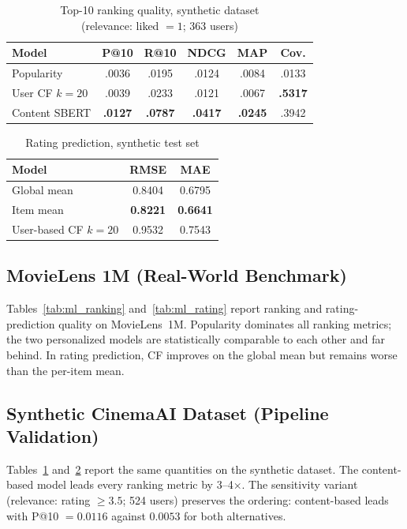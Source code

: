 \documentclass[conference]{IEEEtran}
\begin{document}
\begin{table}[t]
\caption{Top-10 ranking quality, synthetic dataset\\(relevance: liked $=1$; 363 users)}
\label{tab:syn_ranking}
\centering
\begin{tabular}{lccccc}
\toprule
Model & P@10 & R@10 & NDCG & MAP & Cov. \\
\midrule
Popularity & .0036 & .0195 & .0124 & .0084 & .0133 \\
User CF $k{=}20$ & .0039 & .0233 & .0121 & .0067 & \textbf{.5317} \\
Content SBERT & \textbf{.0127} & \textbf{.0787} & \textbf{.0417} & \textbf{.0245} & .3942 \\
\bottomrule
\end{tabular}
\end{table}

\begin{table}[t]
\caption{Rating prediction, synthetic test set}
\label{tab:syn_rating}
\centering
\begin{tabular}{lcc}
\toprule
Model & RMSE & MAE \\
\midrule
Global mean & 0.8404 & 0.6795 \\
Item mean & \textbf{0.8221} & \textbf{0.6641} \\
User-based CF $k{=}20$ & 0.9532 & 0.7543 \\
\bottomrule
\end{tabular}
\end{table}

\subsection{MovieLens 1M (Real-World Benchmark)}
Tables~\ref{tab:ml_ranking} and~\ref{tab:ml_rating} report ranking and
rating-prediction quality on MovieLens~1M. Popularity dominates all ranking
metrics; the two personalized models are statistically comparable to each other
and far behind. In rating prediction, CF improves on the global mean but
remains worse than the per-item mean.

\subsection{Synthetic CinemaAI Dataset (Pipeline Validation)}
Tables~\ref{tab:syn_ranking} and~\ref{tab:syn_rating} report the same
quantities on the synthetic dataset. The content-based model leads every
ranking metric by 3--4$\times$. The sensitivity variant (relevance: rating
$\ge 3.5$; 524 users) preserves the ordering: content-based leads with
P@10 $= 0.0116$ against $0.0053$ for both alternatives.
\end{document}
